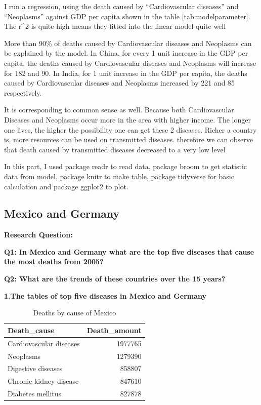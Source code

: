 \documentclass[11pt,a4paper,]{article}
\begin{document}
I run a regression, using the death caused by ``Cardiovascular diseases'' and ``Neoplasms'' against GDP per capita shown in the table \ref{tab:modelparameter}. The r\^{}2 is quite high means they fitted into the linear model quite well

More than 90\% of deaths caused by Cardiovascular diseases and Neoplasms can be explained by the model. In China, for every 1 unit increase in the GDP per capita, the deaths caused by Cardiovascular diseases and Neoplasms will increase for 182 and 90. In India, for 1 unit increase in the GDP per capita, the deaths caused by Cardiovascular diseases and Neoplasms increased by 221 and 85 respectively.

It is corresponding to common sense as well. Because both Cardiovascular Diseases and Neoplasms occur more in the area with higher income. The longer one lives, the higher the possibility one can get these 2 diseases. Richer a country is, more resources can be used on transmitted diseases. therefore we can observe that death caused by transmitted diseases decreased to a very low level

In this part, I used package readr \textcite{readr} to read data, package broom \textcite{broom} to get statistic data from model, package knitr \textcite{knitr} to make table, package tidyverse \textcite{tidyverse} for basic calculation and package ggplot2 \textcite{ggplot2} to plot.

\clearpage

\hypertarget{mexico-and-germany}{%
\subsection{Mexico and Germany}\label{mexico-and-germany}}

\textbf{Research Question:}

\textbf{Q1: In Mexico and Germany what are the top five diseases that cause the most deaths from 2005?}

\textbf{Q2: What are the trends of these countries over the 15 years?}

\textbf{1.The tables of top five diseases in Mexico and Germany}

\begin{table}

\caption{\label{tab:Mexicotable}Deaths by cause of Mexico}
\centering
\begin{tabular}[t]{l|r}
\hline
Death\_cause & Death\_amount\\
\hline
Cardiovascular diseases & 1977765\\
\hline
Neoplasms & 1279390\\
\hline
Digestive diseases & 858807\\
\hline
Chronic kidney disease & 847610\\
\hline
Diabetes mellitus & 827878\\
\hline
\end{tabular}
\end{table}
\end{document}
